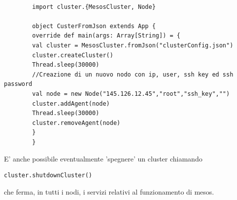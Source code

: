 \documentclass[12pt,a4paper]{article}
\begin{document}
    \begin{lstlisting}[style=myScalastyle]

        import cluster.{MesosCluster, Node}

        object CusterFromJson extends App {
        override def main(args: Array[String]) = {
        val cluster = MesosCluster.fromJson("clusterConfig.json")
        cluster.createCluster()
        Thread.sleep(30000)
        //Creazione di un nuovo nodo con ip, user, ssh key ed ssh password
        val node = new Node("145.126.12.45","root","ssh_key","")
        cluster.addAgent(node)
        Thread.sleep(30000)
        cluster.removeAgent(node)
        }
        }
    \end{lstlisting}
    E' anche possibile eventualmente 'spegnere' un cluster chiamando
    \begin{lstlisting}[style=myScalastyle]
        cluster.shutdownCluster()
    \end{lstlisting}
    che ferma, in tutti i nodi, i servizi relativi al funzionamento di mesos.
\end{document}
